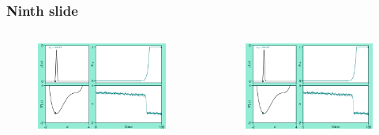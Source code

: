 \documentclass[./main.tex]{subfiles}
\begin{document}
\begin{frame}[label=slide09]
        \frametitle{Ninth slide}

        \begin{columns}
                \begin{figure}
                    \centering
                    \includegraphics[keepaspectratio, width=\textwidth]{./figures/figure.png}
                \end{figure}
                \begin{figure}
                    \centering
                    \includegraphics[keepaspectratio, width=\textwidth]{./figures/figure.png}
                \end{figure}
                

\end{columns}
\end{frame}
\end{document}
